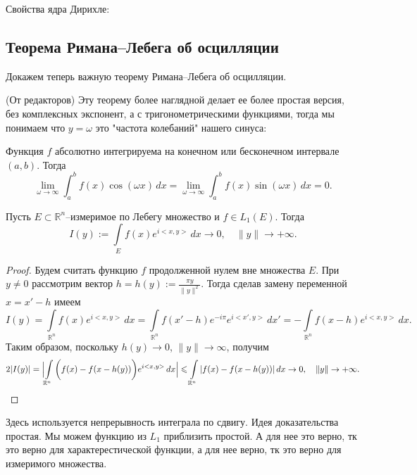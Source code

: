 Свойства ядра Дирихле:

\subsection{Теорема Римана--Лебега об осцилляции}

Докажем теперь важную теорему Римана--Лебега об осцилляции.
\begin{note}
    (От редакторов) Эту теорему более наглядной делает ее более простая версия, без комплексных экспонент, а с тригонометрическими функциями, тогда мы понимаем что $y=\omega$ это "частота колебаний" нашего синуса:

Функция \( f \) абсолютно интегрируема на конечном или бесконечном интервале \( (a, b) \). Тогда
\[
\lim_{\omega \to \infty} \int_a^b f(x) \cos(\omega x)\,dx = \lim_{\omega \to \infty} \int_a^b f(x) \sin(\omega x)\,dx = 0.
\]
\end{note}
    
\begin{theorem}
Пусть $E \subset \mathbb{R}^{n}$--измеримое по Лебегу множество и $f \in L_{1}(E)$. Тогда
\begin{equation}
\label{Th.Riemann_Lebesgue}
I(y):=\int\limits_{E}f(x)e^{i<x,y>}\,dx \to 0, \quad \|y\| \to +\infty.
\end{equation}
\end{theorem}
\begin{proof}
    Будем считать функцию $f$ продолженной нулем вне множества $E$.
При $y \neq 0$ рассмотрим вектор $h=h(y):=\frac{\pi y}{\|y\|^{2}}$.
Тогда сделав замену переменной $x=x'-h$ имеем
$$
I(y)=\int\limits_{\mathbb{R}^{n}}f(x)e^{i<x,y>}\,dx = \int\limits_{\mathbb{R}^{n}}f(x'-h)e^{-i\pi}e^{i<x',y>}\,dx' = -\int\limits_{\mathbb{R}^{n}}f(x-h)e^{i<x,y>}\,dx.
$$
Таким образом, поскольку $h(y) \to 0$, $\|y\| \to \infty$, получим
\begin{equation}
2|I(y)| = \Bigl|\int\limits_{\mathbb{R}^{n}}\bigg(f(x)-f(x-h(y))\bigg)e^{i<x,y>}\,dx\Bigr| \le \int\limits_{\mathbb{R}^{n}}|f(x)-f(x-h(y))|\,dx \to 0, \quad \|y\| \to +\infty.
\end{equation}
\end{proof}
\begin{note}
    Здесь используется непрерывность интеграла по сдвигу. Идея доказательства простая. Мы можем функцию из $L_1$ приблизить простой. А для нее это верно, тк это верно для характерестической функции, а для нее верно, тк это верно для измеримого множества.
\end{note}



